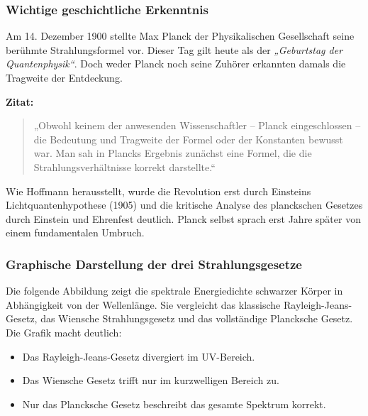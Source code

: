 \subsubsection{Wichtige geschichtliche Erkenntnis}
\vspace{1em}
\begin{tcolorbox}[didaktikbox,title=Wichtige geschichtliche Erkenntnis {\cite{Hoffmann2008}}]
	\label{box:geschichte-planck}
	Am 14. Dezember 1900 stellte Max Planck der Physikalischen Gesellschaft seine berühmte Strahlungsformel vor. Dieser Tag gilt heute als der \textit{„Geburtstag der Quantenphysik“}. Doch weder Planck noch seine Zuhörer erkannten damals die Tragweite der Entdeckung.
	
	\medskip
	
	\textbf{Zitat:} 
	\begin{quote}
		„Obwohl keinem der anwesenden Wissenschaftler – Planck eingeschlossen – die Bedeutung und Tragweite der Formel oder der Konstanten bewusst war. Man sah in Plancks Ergebnis zunächst eine Formel, die die Strahlungsverhältnisse korrekt darstellte.“
	\end{quote}
	
	Wie Hoffmann herausstellt, wurde die Revolution erst durch Einsteins Lichtquantenhypothese (1905) und die kritische Analyse des planckschen Gesetzes durch Einstein und Ehrenfest deutlich. Planck selbst sprach erst Jahre später von einem fundamentalen Umbruch.
\end{tcolorbox}

\subsubsection{Graphische Darstellung der drei Strahlungsgesetze}

Die folgende Abbildung zeigt die spektrale Energiedichte schwarzer Körper in Abhängigkeit von der Wellenlänge. Sie vergleicht das klassische Rayleigh-Jeans-Gesetz, das Wiensche Strahlungsgesetz und das vollständige Plancksche Gesetz. Die Grafik macht deutlich:

\begin{itemize}
	\item Das Rayleigh-Jeans-Gesetz divergiert im UV-Bereich.
	\item Das Wiensche Gesetz trifft nur im kurzwelligen Bereich zu.
	\item Nur das Plancksche Gesetz beschreibt das gesamte Spektrum korrekt.
\end{itemize}

